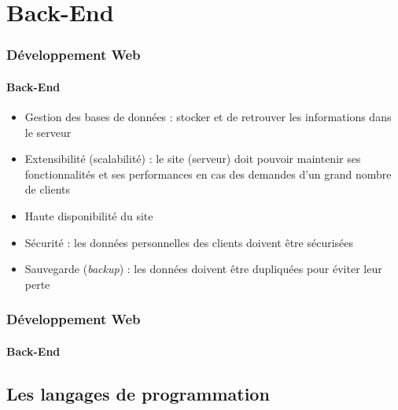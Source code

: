 \documentclass[xcolor=table]{beamer}
\begin{document}
\section{Back-End}

\begin{frame}
\frametitle{Développement Web}
\framesubtitle{Back-End}

\begin{itemize}
	\item Gestion des bases de données : stocker et de retrouver les informations dans le serveur
	\item Extensibilité (scalabilité) : le site (serveur) doit pouvoir maintenir ses fonctionnalités et ses performances en cas des demandes d'un grand nombre de clients
	\item Haute disponibilité du site
	\item Sécurité : les données personnelles des clients doivent être sécurisées
	\item Sauvegarde (\textit{backup}) : les données doivent être dupliquées pour éviter leur perte
\end{itemize}

\end{frame}

\begin{frame}
\frametitle{Développement Web}
\framesubtitle{Back-End}


\end{frame}

\subsection{Les langages de programmation}
\end{document}
